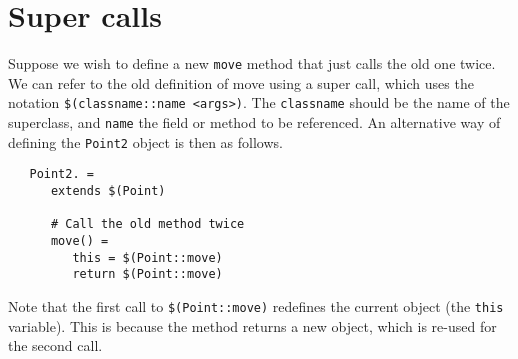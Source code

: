 \section{Super calls}

Suppose we wish to define a new \verb+move+ method that just calls the old one twice.
We can refer to the old definition of move using a super call, which uses the notation
\verb+$(classname::name <args>)+.  The \verb+classname+ should be the name of the
superclass, and \verb+name+ the field or method to be referenced.  An alternative
way of defining the \verb+Point2+ object is then as follows.

\begin{verbatim}
   Point2. =
      extends $(Point)

      # Call the old method twice
      move() =
         this = $(Point::move)
         return $(Point::move)
\end{verbatim}

Note that the first call to \verb+$(Point::move)+ redefines the
current object (the \verb+this+ variable).  This is because the method
returns a new object, which is re-used for the second call.


